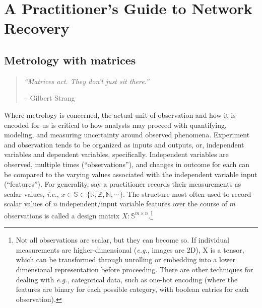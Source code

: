 \documentclass[%
	12pt,
		oneside,
		letterpaper
]{book}
\begin{document}
\part{A Practitioner's Guide to Network Recovery}

\chapter{Metrology with matrices}\label{sec-mat-met}

\begin{flushright}

\begin{minipage}{.7\linewidth}

\singlespacing

\begin{quote}
\emph{``Matrices act. They don't just sit there.''}

\hfill -- Gilbert Strang\\
\end{quote}

\doublespacing

\end{minipage}

\end{flushright}

Where metrology is concerned, the actual unit of observation and how it
is encoded for us is critical to how analysts may proceed with
quantifying, modeling, and measuring uncertainty around observed
phenomena. Experiment and observation tends to be organized as inputs
and outputs, or, independent variables and dependent variables,
specifically. Independent variables are observed, multiple times
(``observations''), and changes in outcome for each can be compared to
the varying values associated with the independent variable input
(``features''). For generality, say a practitioner records their
measurements as scalar values, \emph{i.e.},
\(x\in\mathbb{S}\in\{\mathbb{R,Z,N},\cdots\}\). The structure most often
used to record scalar values of \(n\) independent/input variable
features over the course of \(m\) observations is called a design matrix
\(X:\mathbb{S}^{m\times n}\).\footnote{ Not all observations are scalar,
  but they can become so. If individual measurements are
  higher-dimensional (\emph{e.g.}, images are 2D), X is a tensor, which
  can be transformed through unrolling or embedding into a lower
  dimensional representation before proceeding. There are other
  techniques for dealing with \emph{e.g.}, categorical data, such as
  one-hot encoding (where the features are binary for each possible
  category, with boolean entries for each observation).}
\end{document}
